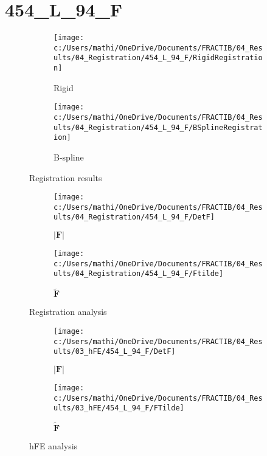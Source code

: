 \documentclass{article}%
\begin{document}
%
\newpage%
\section*{454\_L\_94\_F}%
\label{sec:454L94F}%


\begin{figure}[h!]%
\begin{subfigure}[b]{0.5\linewidth}%
\texttt{[image: c:/Users/mathi/OneDrive/Documents/FRACTIB/04\_Results/04\_Registration/454\_L\_94\_F/RigidRegistration]}%
\caption{Rigid}%
\end{subfigure}%
\begin{subfigure}[b]{0.5\linewidth}%
\texttt{[image: c:/Users/mathi/OneDrive/Documents/FRACTIB/04\_Results/04\_Registration/454\_L\_94\_F/BSplineRegistration]}%
\caption{B{-}spline}%
\end{subfigure}%
\caption{Registration results}%
\end{figure}

%


\begin{figure}[h!]%
\begin{subfigure}[b]{0.5\linewidth}%
\texttt{[image: c:/Users/mathi/OneDrive/Documents/FRACTIB/04\_Results/04\_Registration/454\_L\_94\_F/DetF]}%
\caption{$|\mathbf{F}|$}%
\end{subfigure}%
\begin{subfigure}[b]{0.5\linewidth}%
\texttt{[image: c:/Users/mathi/OneDrive/Documents/FRACTIB/04\_Results/04\_Registration/454\_L\_94\_F/Ftilde]}%
\caption{$\tilde{\mathbf{F}}$}%
\end{subfigure}%
\caption{Registration analysis}%
\end{figure}

%


\begin{figure}[h!]%
\begin{subfigure}[b]{0.5\linewidth}%
\texttt{[image: c:/Users/mathi/OneDrive/Documents/FRACTIB/04\_Results/03\_hFE/454\_L\_94\_F/DetF]}%
\caption{$|\mathbf{F}|$}%
\end{subfigure}%
\begin{subfigure}[b]{0.5\linewidth}%
\texttt{[image: c:/Users/mathi/OneDrive/Documents/FRACTIB/04\_Results/03\_hFE/454\_L\_94\_F/FTilde]}%
\caption{$\tilde{\mathbf{F}}$}%
\end{subfigure}%
\caption{hFE analysis}%
\end{figure}
\end{document}
